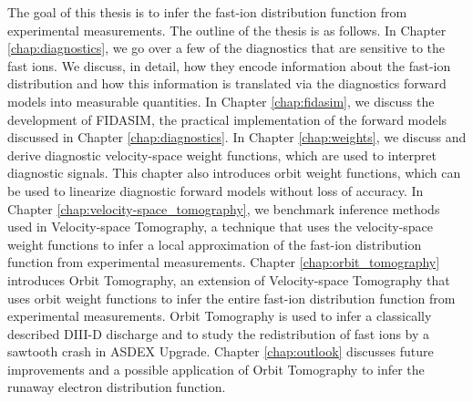 The goal of this thesis is to infer the fast-ion distribution function from experimental measurements. The outline of the thesis is as follows. In Chapter \ref{chap:diagnostics}, we go over a few of the diagnostics that are sensitive to the fast ions. We discuss, in detail, how they encode information about the fast-ion distribution and how this information is translated via the diagnostics forward models into measurable quantities. In Chapter \ref{chap:fidasim}, we discuss the development of FIDASIM\cite{heidbrink2011code,geiger2013thesis,FIDASIM}, the practical implementation of the forward models discussed in Chapter \ref{chap:diagnostics}. In Chapter \ref{chap:weights}, we discuss and derive diagnostic velocity-space weight functions, which are used to interpret diagnostic signals.\cite{heidbrink2007,salewski2011,salewski2012,Muscatello2012,collins2015characterizing,collins2016observation,collins2017phase,collins2016critical,heidbrink2016interpretation} This chapter also introduces orbit weight functions\cite{stagner2017action}, which can be used to linearize diagnostic forward models without loss of accuracy. In Chapter \ref{chap:velocity-space_tomography}, we benchmark\cite{jacobsen_stagner2016} inference methods used in Velocity-space Tomography, a technique that uses the velocity-space weight functions to infer a local approximation of the fast-ion distribution function from experimental measurements.\cite{heidbrink2007,salewski2011,salewski2012,Muscatello2012,Salewski2014a,jacobsen2015,salewski2013_tomography,salewski2014_tomography,salewski2016,salewski2016high,weiland2016}
Chapter \ref{chap:orbit_tomography} introduces Orbit Tomography, an extension of Velocity-space Tomography that uses orbit weight functions to infer the entire fast-ion distribution function from experimental measurements. Orbit Tomography is used to infer a classically described DIII-D discharge and to study the redistribution of fast ions by a sawtooth crash in ASDEX Upgrade. Chapter \ref{chap:outlook} discusses future improvements and a possible application of Orbit Tomography to infer the runaway electron distribution function.


